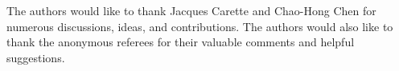 \documentclass[acmsmall]{acmart}
\begin{document}

\renewcommand{\appendixsectionformat}[2]{
  {Supplementary material for Section~#1}
}




\begin{acks}
  The authors would like to thank Jacques Carette and Chao-Hong Chen for numerous discussions, ideas, and contributions.  The authors would also like to thank the anonymous referees for their valuable comments and helpful suggestions.
\end{acks}


\end{document}
